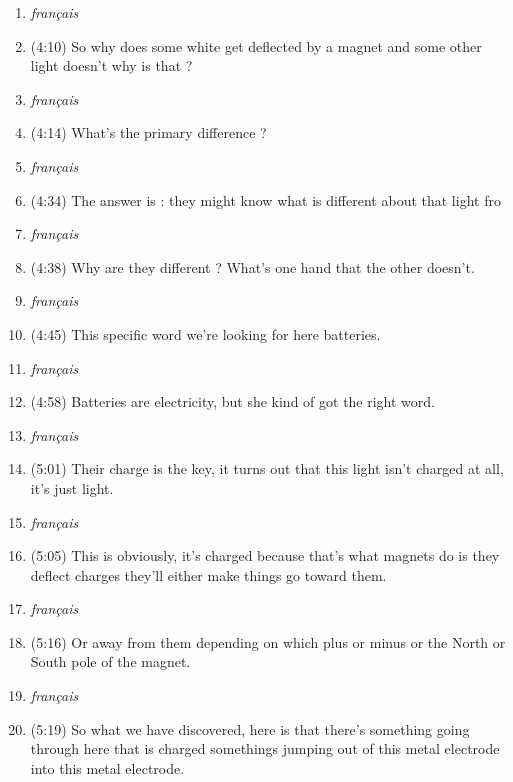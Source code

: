 \documentclass[../main.tex]{subfiles}
\begin{document}
\begin{enumerate}
     \item \hspace*{1cm} \emph{ français }
    \item (4:10) So why does some white get deflected by a magnet and some other light doesn't why is that ?
     \item \hspace*{1cm} \emph{ français }
    \item (4:14) What's the primary difference ? 
     \item \hspace*{1cm} \emph{ français }
    \item (4:34) The answer is : they might know what is different about that light fro
     \item \hspace*{1cm} \emph{ français }
    \item (4:38) Why are they different ? What's one hand that the other doesn't.
     \item \hspace*{1cm} \emph{ français }
    \item (4:45) This specific word we're looking for here batteries.
     \item \hspace*{1cm} \emph{ français }
    \item (4:58) Batteries are electricity, but she kind of got the right word.
     \item \hspace*{1cm} \emph{ français }
    \item (5:01) Their charge is the key, it turns out that this light isn't charged at all, it's just light.
     \item \hspace*{1cm} \emph{ français }
    \item (5:05) This is obviously, it's charged because that's what magnets do is they deflect charges they'll either make things go toward them.
     \item \hspace*{1cm} \emph{ français }
    \item (5:16) Or away from them depending on which plus or minus or the North or South pole of the magnet.
     \item \hspace*{1cm} \emph{ français }
    \item (5:19) So what we have discovered, here is that there's something going through here that is charged somethings jumping out of this metal electrode into this metal electrode.

\end{enumerate}
\end{document}
